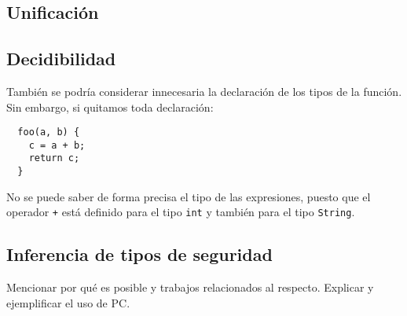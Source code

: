 \subsection{Unificación}
\subsection{Decidibilidad}
También se podría considerar innecesaria la declaración de los tipos de la función. Sin embargo, si quitamos toda declaración:

\begin{lstlisting}
  foo(a, b) {
    c = a + b;
    return c;
  }
\end{lstlisting}

No se puede saber de forma precisa el tipo de las expresiones, puesto que el operador \texttt{+} está definido para el tipo \texttt{int} y también para el tipo \texttt{String}.

\subsection{Inferencia de tipos de seguridad}
Mencionar por qué es posible y trabajos relacionados al respecto. Explicar y ejemplificar el uso de PC.
